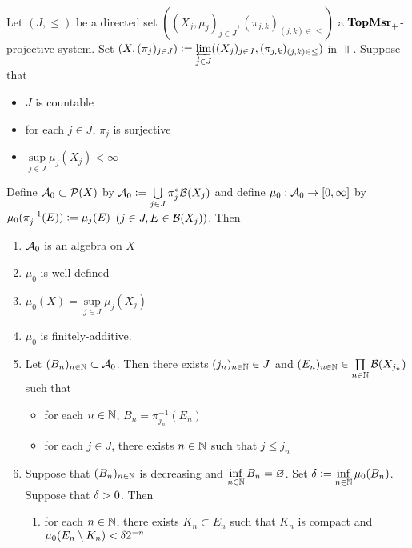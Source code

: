 \documentclass{book}
\begin{document}

\begin{ex} \lex{}  \\
	Let $(J, {\leq})$ be a directed set $((X_j, \mu_j)_{j \in J}, (\pi_{j,k})_{(j,k) \in {\leq}})$ a $\operatorname*{\text{\textbf{TopMsr}}_{+}}$-projective system. Set $(X, (\pi_j)_{j \in J}) \vcentcolon= \varprojlim\limits_{j \in J} ((X_j)_{j \in J}, (\pi_{j,k})_{(j,k) \in {\leq}})$ in $\Top$. Suppose that 
	\begin{itemize}
		\item $J$ is countable
		\item for each $j \in J$, $\pi_j$ is surjective
		\item $\sup\limits_{j \in J} \mu_j(X_j) < \infty$ 
	\end{itemize}
	Define $\mathcal{A}_0 \subset \mathcal{P}(X)$ by $\mathcal{A}_0 \vcentcolon= \bigcup\limits_{j \in J} \pi_j^*\mathcal{B}(X_j)$ and define $\mu_0: \mathcal{A}_0 \rightarrow [0,\infty]$ by $\mu_0(\pi_j^{-1}(E)) \vcentcolon= \mu_j(E)$ $(j \in J, E \in \mathcal{B}(X_j))$. Then
	\begin{enumerate}
		\item $\mathcal{A}_0$ is an algebra on $X$
		\item $\mu_0$ is well-defined
		\item $\mu_0(X) = \sup\limits_{j \in J} \mu_j(X_j)$
		\item $\mu_0$ is finitely-additive.
		\item Let $(B_n)_{n \in \mathbb{N}} \subset \mathcal{A}_0$. Then there exists $(j_n)_{n \in \mathbb{N}} \in J$ and $(E_n)_{n \in \mathbb{N}} \in \prod\limits_{n \in \mathbb{N}} \mathcal{B}(X_{j_n})$ such that 
		\begin{itemize}
			\item for each $n \in \mathbb{N}$, $B_n = \pi_{j_n}^{-1}(E_n)$ 
			\item for each $j \in J$, there exists $n \in \mathbb{N}$ such that $j \leq j_n$
		\end{itemize}
		\item Suppose that $(B_n)_{n \in \mathbb{N}}$ is decreasing and $\inf\limits_{n \in \mathbb{N}} B_n = \varnothing$. Set $\delta \vcentcolon= \inf\limits_{n \in \mathbb{N}} \mu_0(B_n)$. Suppose that $\delta > 0$. Then 
		\begin{enumerate}
			\item for each $n \in \mathbb{N}$, there exists $K_n \subset E_n$ such that $K_n$ is compact and $\mu_0(E_n \setminus K_n) < \delta2^{-n}$

\end{enumerate}
\end{enumerate}
\end{ex}
\end{document}
